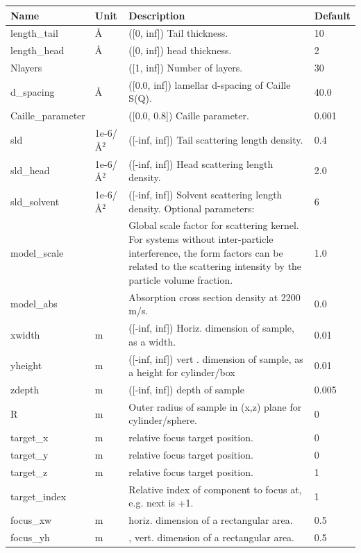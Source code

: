 \begin{longtable}{p{}p{}p{}p{}}
\toprule
\textbf{Name} & \textbf{Unit} & \textbf{Description} & \textbf{Default} \\
\midrule
\endhead
length\_tail & \AA{} & ([0, inf]) Tail thickness. & 10 \\
length\_head & \AA{} & ([0, inf]) head thickness. & 2 \\
Nlayers &  & ([1, inf]) Number of layers. & 30 \\
d\_spacing & \AA{} & ([0.0, inf]) lamellar d-spacing of Caille S(Q). & 40.0 \\
Caille\_parameter &  & ([0.0, 0.8]) Caille parameter. & 0.001 \\
sld & 1e-6/\AA{}$^{2}$ & ([-inf, inf]) Tail scattering length density. & 0.4 \\
sld\_head & 1e-6/\AA{}$^{2}$ & ([-inf, inf]) Head scattering length density. & 2.0 \\
sld\_solvent & 1e-6/\AA{}$^{2}$ & ([-inf, inf]) Solvent scattering length density. Optional parameters: & 6 \\
model\_scale &   & Global scale factor for scattering kernel. For systems without inter-particle interference, the form factors can be related to the scattering intensity by the particle volume fraction. & 1.0 \\
model\_abs &   & Absorption cross section density at 2200 m/s. & 0.0 \\
xwidth & m & ([-inf, inf]) Horiz. dimension of sample, as a width. & 0.01 \\
yheight & m & ([-inf, inf]) vert . dimension of sample, as a height for cylinder/box & 0.01 \\
zdepth & m & ([-inf, inf]) depth of sample & 0.005 \\
R & m & Outer radius of sample in (x,z) plane for cylinder/sphere. & 0 \\
target\_x & m & relative focus target position. & 0 \\
target\_y & m & relative focus target position. & 0 \\
target\_z & m & relative focus target position. & 1 \\
target\_index &   & Relative index of component to focus at, e.g. next is +1. & 1 \\
focus\_xw & m & horiz. dimension of a rectangular area. & 0.5 \\
focus\_yh & m & , vert. dimension of a rectangular area. & 0.5 \\

\end{longtable}
